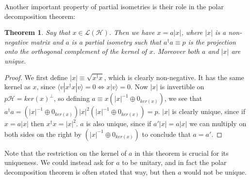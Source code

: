 \documentclass[12pt]{article}
\newcommand{\lan}{\langle}
\newcommand{\ran}{\rangle}
\newcommand{\Ll}{\mathcal{L}}
\newcommand{\Hh}{\mathcal{H}}
\newcommand{\LH}{\Ll(\Hh)}
\newtheorem{thm}{Theorem}[section]
\begin{document}
Another important property of partial isometries is their role in the polar decomposition theorem:
\begin{thm}\label{pdthm}
Say that $x\in \LH$.  Then we have $x=a|x|$, where $|x|$ is a non-negative matrix and $a$ is a partial isometry such that $a^\dagger a\equiv p$ is the projection onto the orthogonal complement of the kernel of $x$. Moreover both $a$ and $|x|$ are unique. 
\end{thm}
\begin{proof}
We first define $|x|\equiv \sqrt{x^\dagger x}$, which is clearly non-negative.  It has the same kernel as $x$, since $\lan v|x^\dagger x|v\ran=0 \Leftrightarrow x|v\ran=0$.  Now $|x|$ is invertible on $p\Hh=ker(x)^\perp$, so defining $a\equiv x\left(|x|^{-1}\oplus 0_{ker(x)}\right)$, we see that $a^\dagger a=\left(|x|^{-1}\oplus 0_{ker(x)}\right)|x|^2\left(|x|^{-1}\oplus 0_{ker(x)}\right)=p$.  $|x|$ is clearly unique, since if $x=a|x|$ then $x^\dagger x=|x|^2$.  $a$ is also unique, since if $a'|x|=a|x|$ we can multiply on both sides on the right by $\left(|x|^{-1}\oplus 0_{ker(x)}\right)$ to conclude that $a=a'$.
\end{proof}
Note that the restriction on the kernel of $a$ in this theorem is crucial for its uniqueness.  We could instead ask for $a$ to be unitary, and in fact the polar decomposition theorem is often stated that way, but then $a$ would not be unique.  
\end{document}
